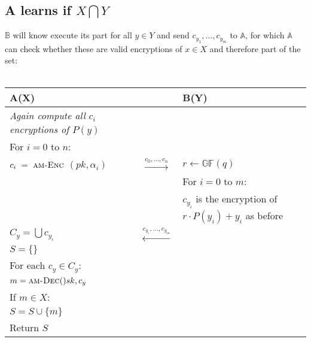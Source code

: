 \documentclass{report}
\begin{document}
		\subsection{A learns if $X \bigcap Y$}
		\startsubsection
			$\mathbb{B}$ will know execute its part for all $y \in Y$ and send $c_{y_1},...,c_{y_m}$ to $\mathbb{A}$, for which $\mathbb{A}$ can check whether these are valid encryptions of $x \in X$ and therefore part of the set: \\ \\
			\begin{tabular}{lcl}
				\hline
				\textbf{A(X)} && \textbf{B(Y)} \\
				\hline
				\textit{Again compute all $c_i$ encryptions of $P(y)$} && \\
				For $i=0$ to $n$: && \\
				\indent $c_i \ = \ \textsc{am-Enc}$ $(pk, \alpha _i)$ & $\stackrel{c_0,...,c_n}{\longrightarrow}$ & $r \leftarrow \mathbb{GF}(q)$ \\
				&& For $i=0$ to $m$: \\
				&& \indent $c_{y_i}$ is the encryption of $r \cdot P(y_i) + y_i$ as before \\
				$C_y = \bigcup c_{y_i}$ & $\stackrel{c_{y_i},...,c_{y_m}}{\longleftarrow}$ & \\
				$S = \{\}$ \\
				For each $c_y \in C_y$: \\
				\indent $m = \textsc{am-Dec}()sk, c_y$ \\
				\indent If $m \in X$: \\
				\indent \indent $S = S \cup \{ m \}$ \\
				Return $S$ \\
				\hline
			\end{tabular}
		\closesection
	\closesection
	
\end{document}
